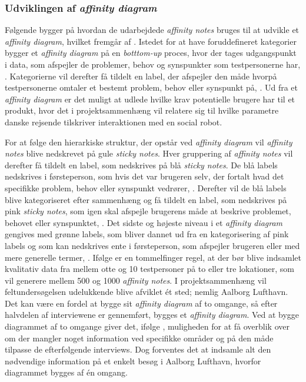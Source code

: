 \subsubsection{Udviklingen af \textit{affinity diagram}}
\label{ParametreUdviklingAfAffinity}
% 
Følgende bygger på hvordan de udarbejdede \textit{affinity notes} bruges til at udvikle et \textit{affinity diagram}, hvilket fremgår af \textcite[ss. 159-179]{Book:BuildingAnAffinity}. Istedet for at have foruddefineret kategorier bygger et \textit{affinity diagram} på en \textit{botttom-up} proces, hvor der tages udgangspunkt i data, som afspejler de problemer, behov og synspunkter som testpersonerne har, \parencite[s. 159]{Book:BuildingAnAffinity}. Kategorierne vil derefter få tildelt en label, der afspejler den måde hvorpå testpersonerne omtaler et bestemt problem, behov eller synspunkt på, \parencite[s. 159]{Book:BuildingAnAffinity}. Ud fra et \textit{affinity diagram} er det muligt at udlede hvilke krav potentielle brugere har til et produkt, hvor det i projektsammenhæng vil relatere sig til hvilke parametre danske rejsende tilskriver interaktionen med en social robot. 

For at følge den hierarkiske struktur, der opstår ved \textit{affinity diagram} vil \textit{affinity notes} blive nedskrevet på gule \textit{sticky notes}. Hver gruppering af \textit{affinity notes} vil derefter få tildelt en label, som nedskrives på blå \textit{sticky notes}. De blå labels nedskrives i førsteperson, som hvis det var brugeren selv, der fortalt hvad det specifikke problem, behov eller synspunkt vedrører, \parencite[s. 160]{Book:BuildingAnAffinity}. Derefter vil de blå labels blive kategoriseret efter sammenhæng og få tildelt en label, som nedskrives på pink \textit{sticky notes}, som igen skal afspejle brugerens måde at beskrive problemet, behovet eller synspunktet, \parencite[s. 160]{Book:BuildingAnAffinity}. Det sidste og højeste niveau i et \textit{affinity diagram} gengives med grønne labels, som bliver dannet ud fra en kategorisering af pink labels og som kan nedskrives ente i førsteperson, som afspejler brugeren eller med mere generelle termer, \parencite[s. 160]{Book:BuildingAnAffinity}. \blankline
%
Ifølge \textcite[s. 161]{Book:BuildingAnAffinity} er en tommelfinger regel, at der bør blive indsamlet kvalitativ data fra mellem otte og 10 testpersoner på to eller tre lokationer, som vil generere mellem 500 og 1000 \textit{affinity notes}. I projektsammenhæng vil feltundersøgelsen udelukkende blive afviklet ét sted; nemlig Aalborg Lufthavn. Det kan være en fordel at bygge sit \textit{affinity diagram} af to omgange, så efter halvdelen af interviewene er gennemført, bygges et \textit{affinity diagram}. Ved at bygge diagrammet af to omgange giver det, ifølge \textcite[s. 162]{Book:BuildingAnAffinity}, muligheden for at få overblik over om der mangler noget information ved specifikke områder og på den måde tilpasse de efterfølgende interviews. Dog forventes det at indsamle alt den nødvendige information på et enkelt besøg i Aalborg Lufthavn, hvorfor diagrammet bygges af én omgang. 

